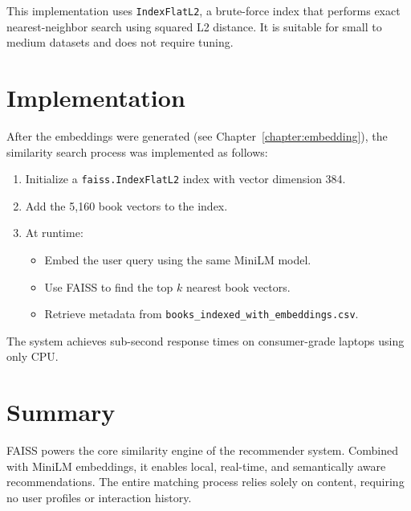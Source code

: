 This implementation uses \texttt{IndexFlatL2}, a brute-force index that performs exact nearest-neighbor search using squared L2 distance. It is suitable for small to medium datasets and does not require tuning.

\section{Implementation}
\label{sec:similarity-implementation}

After the embeddings were generated (see Chapter~\ref{chapter:embedding}), the similarity search process was implemented as follows:

\begin{enumerate}
    \item Initialize a \texttt{faiss.IndexFlatL2} index with vector dimension 384.
    \item Add the 5,160 book vectors to the index.
    \item At runtime:
    \begin{itemize}
        \item Embed the user query using the same MiniLM model.
        \item Use FAISS to find the top \( k \) nearest book vectors.
        \item Retrieve metadata from \texttt{books\_indexed\_with\_embeddings.csv}.
    \end{itemize}
\end{enumerate}

The system achieves sub-second response times on consumer-grade laptops using only CPU.

\section{Summary}
\label{sec:similarity-summary}

FAISS powers the core similarity engine of the recommender system. Combined with MiniLM embeddings, it enables local, real-time, and semantically aware recommendations. The entire matching process relies solely on content, requiring no user profiles or interaction history.
